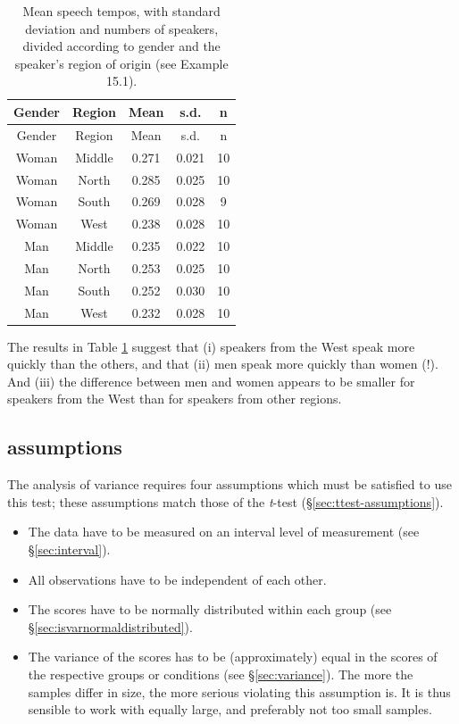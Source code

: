 \documentclass[
]{book}
\begin{document}
\begin{longtable}[]{@{}ccccc@{}}
\caption{\label{tab:sylduration2way} Mean speech tempos, with standard deviation and
numbers of speakers, divided according to gender and the speaker's region of origin
(see Example 15.1).}\tabularnewline
\toprule\noalign{}
Gender & Region & Mean & s.d. & n \\
\midrule\noalign{}
\endfirsthead
\toprule\noalign{}
Gender & Region & Mean & s.d. & n \\
\midrule\noalign{}
\endhead
\bottomrule\noalign{}
\endlastfoot
Woman & Middle & 0.271 & 0.021 & 10 \\
Woman & North & 0.285 & 0.025 & 10 \\
Woman & South & 0.269 & 0.028 & 9 \\
Woman & West & 0.238 & 0.028 & 10 \\
Man & Middle & 0.235 & 0.022 & 10 \\
Man & North & 0.253 & 0.025 & 10 \\
Man & South & 0.252 & 0.030 & 10 \\
Man & West & 0.232 & 0.028 & 10 \\
\end{longtable}

The results in Table \ref{tab:sylduration2way} suggest that (i) speakers from the
West speak more quickly than the others, and that (ii) men speak more quickly than
women (!). And (iii) the difference between men and women appears to be smaller
for speakers from the West than for speakers from other regions.

\subsection{assumptions}\label{assumptions}

The analysis of variance requires four assumptions which
must be satisfied to use this test; these assumptions match those of the
\emph{t}-test
(§\ref{sec:ttest-assumptions}).

\begin{itemize}
\item
  The data have to be measured on an interval level of measurement (see
  §\ref{sec:interval}).
\item
  All observations have to be independent of each other.
\item
  The scores have to be normally distributed within each group (see
  §\ref{sec:isvarnormaldistributed}).
\item
  The variance of the scores has to be (approximately) equal in
  the scores of the respective groups or conditions (see
  §\ref{sec:variance}).
  The more the samples differ in size, the more serious
  violating this assumption is. It is thus sensible to work with
  equally large, and preferably not too small samples.
\end{itemize}
\end{document}
